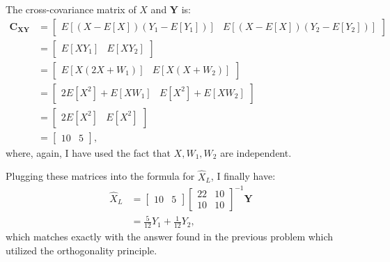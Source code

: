 \begin{problem}{9}
The cross-covariance matrix of $X$ and $\bm Y$ is:
\begin{align*}
\bm{C_{XY}}  &=  \left[\begin{matrix}
    E[(X-E[X])(Y_1-E[Y_1])] &E[(X-E[X])(Y_2-E[Y_2])] 
\end{matrix}\right] \\
&=  \left[\begin{matrix}
    E[XY_1] &E[XY_2] 
\end{matrix}\right] \\
&=  \left[\begin{matrix}
    E[X(2X+W_1)] &E[X(X+W_2)] 
\end{matrix}\right] \\
&=  \left[\begin{matrix}
    2E[X^2]+E[XW_1] & E[X^2]+E[XW_2] 
\end{matrix}\right] \\
&=  \left[\begin{matrix}
    2E[X^2] & E[X^2]
\end{matrix}\right] \\
&=  \left[\begin{matrix}
    10 & 5
\end{matrix}\right],
\end{align*}
where, again, I have used the fact that $X, W_1, W_2$ are independent.

Plugging these matrices into the formula for $\hat X_L$, I finally have:
\begin{align*}
\hat X_L &=\left[\begin{matrix}
    10 & 5
\end{matrix}\right] \left[\begin{matrix}
    22 & 10 \\
    10 & 10 
\end{matrix}\right]^{-1}\bm Y \\
& = \frac{5}{12}Y_1+\frac{1}{12}Y_2,
\end{align*}
which matches exactly with the answer found in the previous problem which utilized the orthogonality principle.

\end{problem}

